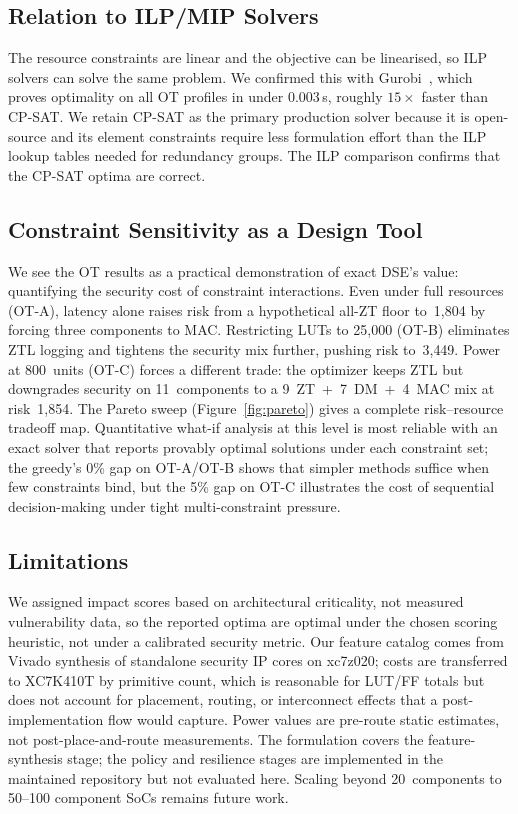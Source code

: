 \documentclass[conference]{IEEEtran}
\begin{document}
\subsection{Relation to ILP/MIP Solvers}

The resource constraints are linear and the objective can be
linearised, so ILP solvers can solve the same problem. We confirmed
this with Gurobi~\cite{gurobi}, which proves optimality on all OT
profiles in under 0.003\,s, roughly $15\times$ faster than CP-SAT.
We retain CP-SAT as the primary production solver because it is
open-source and its element constraints require less formulation
effort than the ILP lookup tables needed for redundancy groups.
The ILP comparison confirms that the CP-SAT optima are correct.

\subsection{Constraint Sensitivity as a Design Tool}

We see the OT results as a practical demonstration of exact DSE's
value: quantifying the security cost of constraint interactions.
Even under full resources (OT-A), latency alone raises risk from a
hypothetical all-ZT floor to~1{,}804 by forcing three components to
MAC.  Restricting LUTs to 25{,}000 (OT-B) eliminates ZTL logging
and tightens the security mix further, pushing risk to~3{,}449.
Power at 800~units (OT-C) forces a different trade: the optimizer
keeps ZTL but downgrades security on 11~components to a
9~ZT~+~7~DM~+~4~MAC mix at risk~1{,}854.  The Pareto sweep
(Figure~\ref{fig:pareto}) gives a complete risk--resource tradeoff
map.  Quantitative what-if analysis at this level is most reliable with an
exact solver that reports provably optimal solutions under each
constraint set; the greedy's 0\% gap on OT-A/OT-B shows that simpler
methods suffice when few constraints bind, but the 5\% gap on OT-C
illustrates the cost of sequential decision-making under tight
multi-constraint pressure.

\subsection{Limitations}

We assigned impact scores based on architectural criticality, not
measured vulnerability data, so the reported optima are optimal
under the chosen scoring heuristic, not under a calibrated security
metric.  Our feature catalog comes from Vivado synthesis of
standalone security IP cores on xc7z020; costs are transferred to
XC7K410T by primitive count, which is reasonable for LUT/FF totals
but does not account for placement, routing, or interconnect
effects that a post-implementation flow would capture.  Power values
are pre-route static estimates, not post-place-and-route
measurements.  The formulation covers the feature-synthesis stage;
the policy and resilience stages are implemented in the maintained
repository but not evaluated here.
Scaling beyond 20~components to 50--100 component SoCs remains
future work.
\end{document}

